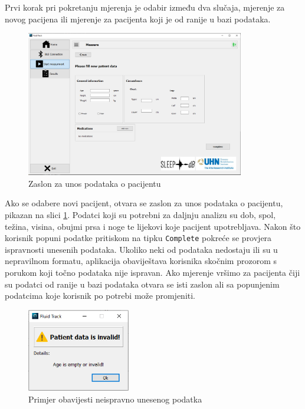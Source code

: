 \documentclass[../diplomski_rad.tex]{subfiles}
\begin{document}
Prvi korak pri pokretanju mjerenja je odabir između dva slučaja, mjerenje za novog pacijena ili 
mjerenje za pacijenta koji je od ranije u bazi podataka.

\begin{figure}[htb]
    \centering
    \includegraphics[width=0.85\textwidth]{Figures/patient.png} 
    \caption{Zaslon za unos podataka o pacijentu}
    \label{slk:patient}
\end{figure}

Ako se odabere novi pacijent, otvara se zaslon za unos podataka o pacijentu, pikazan na slici \ref{slk:patient}. 
Podatci koji su potrebni za daljnju analizu su dob, spol, težina, visina, obujmi prsa i noge te lijekovi koje pacijent upotrebljava. 
Nakon što korisnik popuni podatke pritiskom na tipku \texttt{Complete} pokreće se provjera ispravnosti unesenih podataka. 
Ukoliko neki od podataka nedostaju ili su u nepravilnom formatu, aplikacija obaviještava korisnika skočnim prozorom s 
porukom koji točno podataka nije ispravan. 
Ako mjerenje vršimo za pacijenta čiji su podatci od ranije u bazi podataka otvara se isti zaslon ali sa popunjenim podatcima 
koje korisnik po potrebi može promjeniti.  

\begin{figure}[htb]
    \centering
    \includegraphics[width=0.4\textwidth]{Figures/invalid_data.png} 
    \caption{Primjer obavijesti neispravno unesenog podatka}
    \label{slk:invalid_data}
\end{figure}
\end{document}
